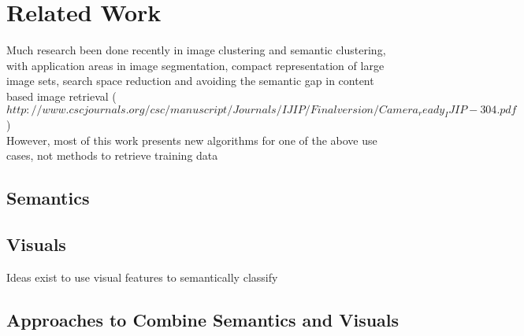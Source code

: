 %
\section{Related Work}
\label{sec_relatedwork}

Much research been done recently in image clustering and semantic clustering, with application areas in image segmentation, compact representation of large image sets, search space reduction and avoiding the semantic gap in content based image retrieval ($http://www.cscjournals.org/csc/manuscript/Journals/IJIP/Finalversion/Camera_ready_IJIP-304.pdf$) \\
However, most of this work presents new algorithms for one of the above use cases, not methods to retrieve training data

\subsection{Semantics}


\subsection{Visuals}
Ideas exist to use visual features to semantically classify 

\subsection{Approaches to Combine Semantics and Visuals}

